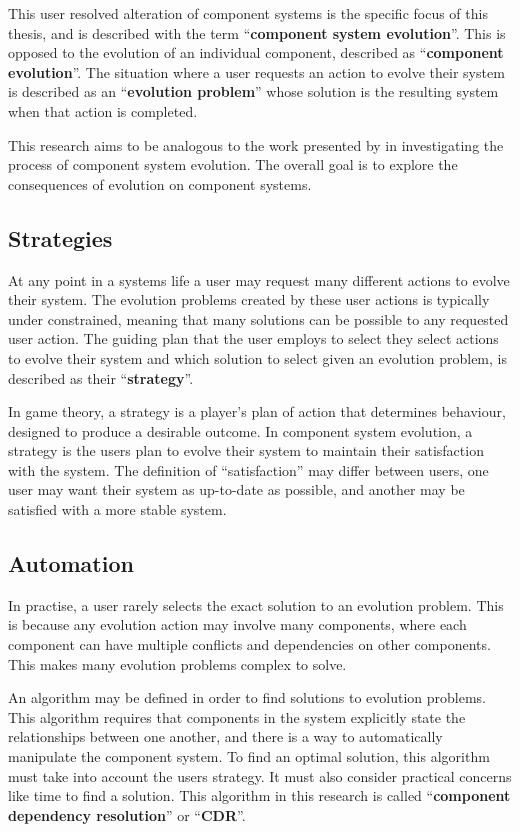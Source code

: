 This user resolved alteration of component systems is the specific focus of this thesis, and is described with the term ``\textbf{component system evolution}''.
This is opposed to the evolution of an individual component, described as ``\textbf{component evolution}''.
The situation where a user requests an action to evolve their system is described as an ``\textbf{evolution problem}'' whose solution is the resulting system when that action is completed.

This research aims to be analogous to the work presented by \cite{lehman1980} in investigating the process of component system evolution.
The overall goal is to explore the consequences of evolution on component systems.

\subsection{Strategies}
At any point in a systems life a user may request many different actions to evolve their system.
The evolution problems created by these user actions is typically under constrained, meaning that many solutions can be possible to any requested user action.
The guiding plan that the user employs to select they select actions to evolve their system and which solution to select given an evolution problem, is described as their ``\textbf{strategy}''.

In game theory, a strategy is a player's plan of action that determines behaviour, designed to produce a desirable outcome.
In component system evolution, a strategy is the users plan to evolve their system to maintain their satisfaction with the system.
The definition of ``satisfaction'' may differ between users, one user may want their system as up-to-date as possible, 
and another may be satisfied with a more stable system.

\subsection{Automation}
In practise, a user rarely selects the exact solution to an evolution problem.
This is because any evolution action may involve many components, 
where each component can have multiple conflicts and dependencies on other components.
This makes many evolution problems complex to solve.

An algorithm may be defined in order to find solutions to evolution problems.
This algorithm requires that components in the system explicitly state the relationships between one another, and there is a way to automatically manipulate the component system.
To find an optimal solution, this algorithm must take into account the users strategy.
It must also consider practical concerns like time to find a solution.
This algorithm in this research is called ``\textbf{component dependency resolution}'' or ``\textbf{CDR}''.

